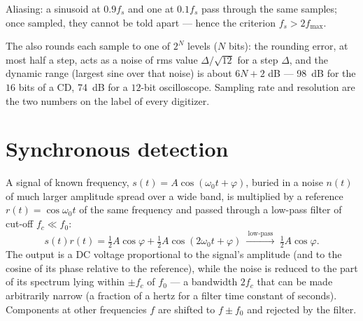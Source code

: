 \begin{omfigure}

{\small Aliasing: a sinusoid at $0.9f_s$ and one at $0.1f_s$ pass through
the same samples; once sampled, they cannot be told apart --- hence the
criterion $f_s > 2f_{\max}$.}
\end{omfigure}

\begin{remark}[Quantization]\label{rem:b2:feedback-oscillators:quantization}
The  also rounds each sample to one of
$2^N$ levels ($N$ bits): the rounding error, at most half a step, acts
as a noise of rms value $\Delta/\sqrt{12}$ for a step $\Delta$, and the
dynamic range (largest sine over that noise) is about $6N + 2$ dB ---
\qty{98}{dB} for the $16$ bits of a CD, \qty{74}{dB} for a $12$-bit
oscilloscope. Sampling rate and resolution are the two numbers on the
label of every digitizer.
\end{remark}

\section{Synchronous detection}

\begin{proposition}\label{prop:b2:feedback-oscillators:lockin}
A signal of known frequency, $s(t) = A\cos(\omega_0t + \varphi)$, buried in a
noise $n(t)$ of much larger amplitude spread over a wide band, is
multiplied by a reference $r(t) = \cos\omega_0t$ of the same frequency
and passed through a low-pass filter of cut-off $f_c \ll f_0$:
\[
s(t)r(t) = \tfrac12A\cos\varphi + \tfrac12A\cos(2\omega_0t + \varphi)
\ \xrightarrow{\ \text{low-pass}\ }\ \tfrac12A\cos\varphi .
\]
The output is a DC voltage proportional to the signal's amplitude (and
to the cosine of its phase relative to the reference), while the noise
is reduced to the part of its spectrum lying within $\pm f_c$ of $f_0$
--- a bandwidth $2f_c$ that can be made arbitrarily narrow (a fraction
of a hertz for a filter time constant of seconds). Components at other
frequencies $f$ are shifted to $f \pm f_0$ and rejected by the filter.
\end{proposition}

